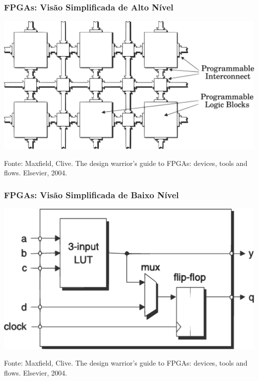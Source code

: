 \documentclass[10pt, compress, aspectratio=169, xcolor={table,usenames,dvipsnames}]{beamer}
\begin{document}
\begin{frame}[fragile]
    \frametitle{FPGAs: Visão Simplificada de Alto Nível}
    \begin{center}
        \includegraphics[width=.8\textwidth]{FPGA_simple}
    \end{center}

    \vfill

    \begin{center}
        \scriptsize{Fonte: Maxfield, Clive. The design warrior's guide to FPGAs: devices, tools and flows. Elsevier, 2004.}
    \end{center}
\end{frame}

\begin{frame}
    \frametitle{FPGAs: Visão Simplificada de Baixo Nível}
    \begin{center}
        \includegraphics[width=.65\textwidth]{logic-block}
    \end{center}

    \vfill

    \begin{center}
        \scriptsize{Fonte: Maxfield, Clive. The design warrior's guide to FPGAs: devices, tools and flows. Elsevier, 2004.}
    \end{center}
\end{frame}
\end{document}
